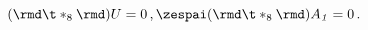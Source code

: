 \begin{equation}
(\rmd\t*_8\rmd) U = 0 \,, \zespai (\rmd\t*_8\rmd)A_{\it 1}=0 \,.
\label{harmonicUA}
\end{equation}

